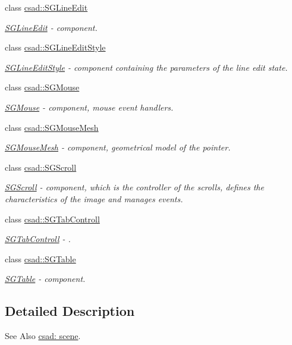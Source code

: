\begin{DoxyCompactItemize}
class \hyperlink{classcsad_1_1_s_g_line_edit}{csad\-::\-S\-G\-Line\-Edit}
\begin{DoxyCompactList}\small\item\em \hyperlink{classcsad_1_1_s_g_line_edit}{S\-G\-Line\-Edit} -\/ component. \end{DoxyCompactList}\item 
class \hyperlink{classcsad_1_1_s_g_line_edit_style}{csad\-::\-S\-G\-Line\-Edit\-Style}
\begin{DoxyCompactList}\small\item\em \hyperlink{classcsad_1_1_s_g_line_edit_style}{S\-G\-Line\-Edit\-Style} -\/ component containing the parameters of the line edit state. \end{DoxyCompactList}\item 
class \hyperlink{classcsad_1_1_s_g_mouse}{csad\-::\-S\-G\-Mouse}
\begin{DoxyCompactList}\small\item\em \hyperlink{classcsad_1_1_s_g_mouse}{S\-G\-Mouse} -\/ component, mouse event handlers. \end{DoxyCompactList}\item 
class \hyperlink{classcsad_1_1_s_g_mouse_mesh}{csad\-::\-S\-G\-Mouse\-Mesh}
\begin{DoxyCompactList}\small\item\em \hyperlink{classcsad_1_1_s_g_mouse_mesh}{S\-G\-Mouse\-Mesh} -\/ component, geometrical model of the pointer. \end{DoxyCompactList}\item 
class \hyperlink{classcsad_1_1_s_g_scroll}{csad\-::\-S\-G\-Scroll}
\begin{DoxyCompactList}\small\item\em \hyperlink{classcsad_1_1_s_g_scroll}{S\-G\-Scroll} -\/ component, which is the controller of the scrolls, defines the characteristics of the image and manages events. \end{DoxyCompactList}\item 
class \hyperlink{classcsad_1_1_s_g_tab_controll}{csad\-::\-S\-G\-Tab\-Controll}
\begin{DoxyCompactList}\small\item\em \hyperlink{classcsad_1_1_s_g_tab_controll}{S\-G\-Tab\-Controll} -\/ . \end{DoxyCompactList}\item 
class \hyperlink{classcsad_1_1_s_g_table}{csad\-::\-S\-G\-Table}
\begin{DoxyCompactList}\small\item\em \hyperlink{classcsad_1_1_s_g_table}{S\-G\-Table} -\/ component. \end{DoxyCompactList}\end{DoxyCompactItemize}


\subsection{Detailed Description}
\begin{DoxySeeAlso}{See Also}
\hyperlink{group__scene}{csad\-: scene}. 
\end{DoxySeeAlso}
